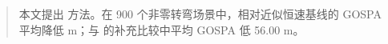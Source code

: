 \begin{abstract}
本文提出 \method 方法。在 900 个非零转弯场景中，\method 相对近似恒速基线的 GOSPA 平均降低 \PrimaryMean m；与 \gtmethod 的补充比较中平均 GOSPA 低 56.00 m。
\end{abstract}
